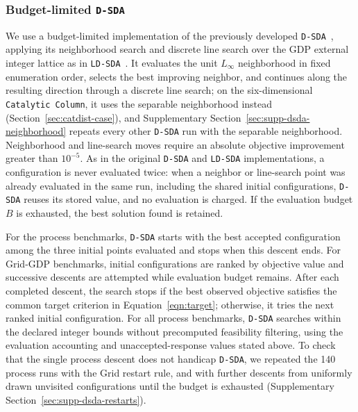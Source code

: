 \documentclass{article}
\begin{document}
\subsubsection{Budget-limited \texttt{D-SDA}} 
We use a budget-limited implementation of the previously developed \texttt{D-SDA}~\citep{linan2020optimal}, applying its neighborhood search and discrete line search over the GDP external integer lattice as in \texttt{LD-SDA}~\citep{ovalle2025logic}.
It evaluates the unit \(L_\infty\) neighborhood in fixed enumeration order, selects the best improving neighbor, and continues along the resulting direction through a discrete line search; on the six-dimensional \texttt{Catalytic Column}, it uses the separable neighborhood instead (Section~\ref{sec:catdist-case}), and Supplementary Section~\ref{sec:supp-dsda-neighborhood} repeats every other \texttt{D-SDA} run with the separable neighborhood.
Neighborhood and line-search moves require an absolute objective improvement greater than \(10^{-5}\).
As in the original \texttt{D-SDA} and \texttt{LD-SDA} implementations, a configuration is never evaluated twice: when a neighbor or line-search point was already evaluated in the same run, including the shared initial configurations, \texttt{D-SDA} reuses its stored value, and no evaluation is charged.
If the evaluation budget \(B\) is exhausted, the best solution found is retained.

For the process benchmarks, \texttt{D-SDA} starts with the best accepted configuration among the three initial points evaluated and stops when this descent ends.
For Grid-GDP benchmarks, initial configurations are ranked by objective value and successive descents are attempted while evaluation budget remains.
After each completed descent, the search stops if the best observed objective satisfies the common target criterion in Equation~\eqref{eqn:target}; otherwise, it tries the next ranked initial configuration.
For all process benchmarks, \texttt{D-SDA} searches within the declared integer bounds without precomputed feasibility filtering, using the evaluation accounting and unaccepted-response values stated above.
To check that the single process descent does not handicap \texttt{D-SDA}, we repeated the 140 process runs with the Grid restart rule, and with further descents from uniformly drawn unvisited configurations until the budget is exhausted (Supplementary Section~\ref{sec:supp-dsda-restarts}).
\end{document}
